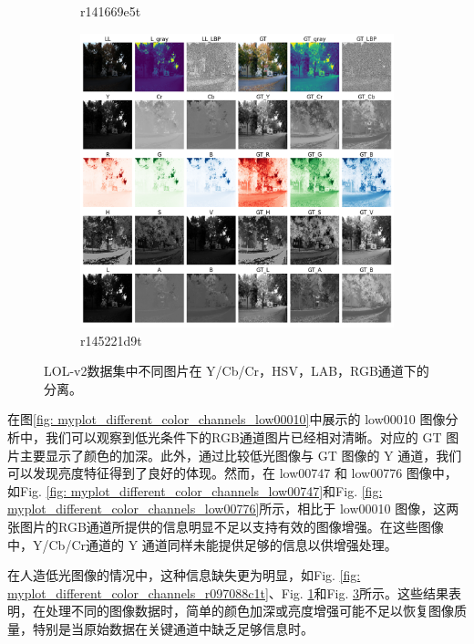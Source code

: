 \documentclass[a4paper]{ctexart}
\begin{document}
\begin{figure}[htbp]
\begin{subfigure}{0.3\textwidth}
			\captionsetup{font=scriptsize}
			\caption{r141669e5t}
			\label{fig: myplot_different_color_channels_r141669e5t}	
		\end{subfigure}
		\begin{subfigure}{0.3\textwidth}
			\includegraphics[width=\linewidth]{picture/LLIE/Experiment/myplot_different_color_channels_r145221d9t}
			\captionsetup{font=scriptsize}
			\caption{r145221d9t}
			\label{fig: myplot_different_color_channels_r145221d9t}	
		\end{subfigure}
		\caption{LOL-v2数据集中不同图片在 Y/Cb/Cr，HSV，LAB，RGB通道下的分离。 }
	\end{figure}
	
	\FloatBarrier
	
	在图\ref{fig: myplot_different_color_channels_low00010}中展示的 low00010 图像分析中，我们可以观察到低光条件下的RGB通道图片已经相对清晰。对应的 GT 图片主要显示了颜色的加深。此外，通过比较低光图像与 GT 图像的 Y 通道，我们可以发现亮度特征得到了良好的体现。然而，在 low00747 和 low00776 图像中，如Fig. \ref{fig: myplot_different_color_channels_low00747}和Fig. \ref{fig: myplot_different_color_channels_low00776}所示，相比于 low00010 图像，这两张图片的RGB通道所提供的信息明显不足以支持有效的图像增强。在这些图像中，Y/Cb/Cr通道的 Y 通道同样未能提供足够的信息以供增强处理。
	
	在人造低光图像的情况中，这种信息缺失更为明显，如Fig. \ref{fig: myplot_different_color_channels_r097088c1t}、Fig. \ref{fig: myplot_different_color_channels_r141669e5t}和Fig. \ref{fig: myplot_different_color_channels_r145221d9t}所示。这些结果表明，在处理不同的图像数据时，简单的颜色加深或亮度增强可能不足以恢复图像质量，特别是当原始数据在关键通道中缺乏足够信息时。
	
\end{document}

